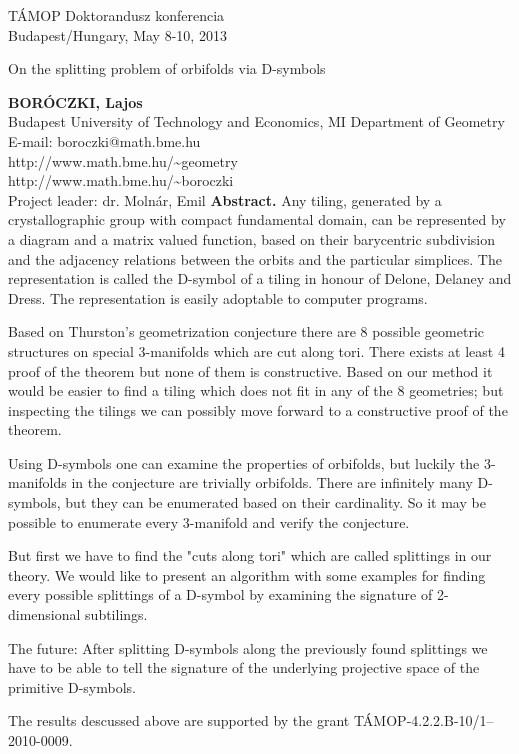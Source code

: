 \documentclass[a4paper]{article}
\begin{document}
\small
TÁMOP Doktorandusz konferencia\\
Budapest/Hungary, May 8-10, 2013
\vfill
\large
\begin{center} 
  On the splitting problem of orbifolds via D-symbols
\end{center}
\vfill
\small
\textbf{BORÓCZKI, Lajos}\\
Budapest University of Technology and Economics, MI Department of Geometry\\
E-mail: boroczki@math.bme.hu\\
http://www.math.bme.hu/\textasciitilde geometry\\
http://www.math.bme.hu/\textasciitilde boroczki\\
Project leader: dr. Molnár, Emil
\vfill
\small
\textbf{Abstract.} Any tiling, generated by a crystallographic group with
compact fundamental domain, can be represented by a diagram and a matrix valued
function, based on their barycentric subdivision and the adjacency relations
between the orbits and the particular simplices. The representation is called
the D-symbol of a tiling in honour of Delone, Delaney and Dress. The
representation is easily adoptable to computer programs.

Based on Thurston's geometrization conjecture there are 8 possible geometric
structures on special 3-manifolds which are cut along tori. There exists at
least 4 proof of the theorem but none of them is constructive. Based on our
method it would be easier to find a tiling which does not fit in any of the 8
geometries; but inspecting the tilings we can possibly move forward to a
constructive proof of the theorem.

Using D-symbols one can examine the properties of orbifolds, but luckily the
3-manifolds in the conjecture are trivially orbifolds. There are infinitely many
D-symbols, but they can be enumerated based on their cardinality. So it may be
possible to enumerate every 3-manifold and verify the conjecture.

But first we have to find the "cuts along tori" which are called splittings in
our theory. We would like to present an algorithm with some examples for finding
every possible splittings of a D-symbol by examining the signature of
2-dimensional subtilings.

The future: After splitting D-symbols along the previously found splittings we
have to be able to tell the signature of the underlying projective space of the
primitive D-symbols.

The results descussed above are supported by the grant
TÁMOP-4.2.2.B-10/1--2010-0009.
\vfill
\vfill
\end{document}
